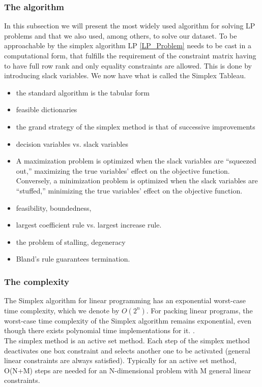 \subsubsection{The algorithm}
In this subsection we will present the most widely used algorithm for solving
LP problems and that we also used, among others, to solve our dataset.
To be approachable by the simplex algorithm LP \ref*{LP_Problem} needs to be cast in a 
computational form, that fulfills the requirement of the constraint matrix having to have
full row rank and only equality  constraints are allowed. This is done by introducing slack
variables. 
We now have what is called the Simplex Tableau. 
\begin{itemize}
    \item the standard algorithm is the tabular form
    \item feasible dictionaries
    \item the grand strategy of the simplex method is that of successive improvements
    \item decision variables vs. slack variables
    \item A maximization problem is optimized when the slack variables are “squeezed out,” maximizing the true variables’ effect on the objective function. Conversely, a minimization problem is optimized when the slack variables are “stuffed,” 
    minimizing the true variables’ effect on the objective function.
    \item feasibility, boundedness, 
    \item largest coefficient rule vs. largest increase rule.
    \item the problem of stalling, degeneracy
    \item Bland's rule guarantees termination.
    
\end{itemize}

\subsubsection{The complexity}
The Simplex algorithm for linear programming has an 
exponential worst-case time complexity, which we denote by \( O(2^n) \).
For packing linear programs, the worst-case time complexity of the Simplex algorithm 
remains exponential, even though there exists polynomial time implementations for it.
\parencite{stille2010solution}.
\\
The simplex method is an active set method.
Each step of the simplex method deactivates one box constraint and 
selects another one to be activated (general linear constraints are 
always satisfied).
Typically for an active set method, O(N+M) steps are needed for 
an N-dimensional problem with M general linear constraints.
